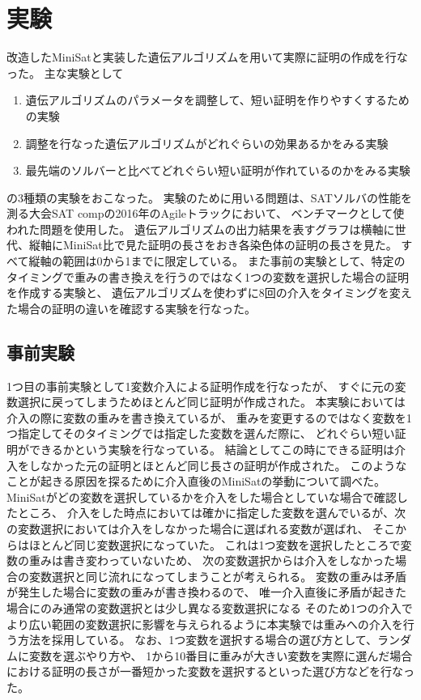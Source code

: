 \section{実験}





改造したMiniSatと実装した遺伝アルゴリズムを用いて実際に証明の作成を行なった。
主な実験として
\begin{enumerate}
    \item 遺伝アルゴリズムのパラメータを調整して、短い証明を作りやすくするための実験
    \item 調整を行なった遺伝アルゴリズムがどれぐらいの効果あるかをみる実験
    \item 最先端のソルバーと比べてどれぐらい短い証明が作れているのかをみる実験
\end{enumerate}
の3種類の実験をおこなった。
実験のために用いる問題は、SATソルバの性能を測る大会SAT compの2016年のAgileトラックにおいて、
ベンチマークとして使われた問題を使用した。
遺伝アルゴリズムの出力結果を表すグラフは横軸に世代、縦軸にMiniSat比で見た証明の長さをおき各染色体の証明の長さを見た。
すべて縦軸の範囲は0から1までに限定している。
また事前の実験として、特定のタイミングで重みの書き換えを行うのではなく1つの変数を選択した場合の証明を作成する実験と、
遺伝アルゴリズムを使わずに8回の介入をタイミングを変えた場合の証明の違いを確認する実験を行なった。





\setcounter{subsection}{-1} %





\subsection{事前実験}

1つ目の事前実験として1変数介入による証明作成を行なったが、
すぐに元の変数選択に戻ってしまうためほとんど同じ証明が作成された。
本実験においては介入の際に変数の重みを書き換えているが、
重みを変更するのではなく変数を1つ指定してそのタイミングでは指定した変数を選んだ際に、
どれぐらい短い証明ができるかという実験を行なっている。
結論としてこの時にできる証明は介入をしなかった元の証明とほとんど同じ長さの証明が作成された。
このようなことが起きる原因を探るために介入直後のMiniSatの挙動について調べた。
MiniSatがどの変数を選択しているかを介入をした場合としていな場合で確認したところ、
介入をした時点においては確かに指定した変数を選んでいるが、次の変数選択においては介入をしなかった場合に選ばれる変数が選ばれ、
そこからはほとんど同じ変数選択になっていた。
これは1つ変数を選択したところで変数の重みは書き変わっていないため、
次の変数選択からは介入をしなかった場合の変数選択と同じ流れになってしまうことが考えられる。
変数の重みは矛盾が発生した場合に変数の重みが書き換わるので、
唯一介入直後に矛盾が起きた場合にのみ通常の変数選択とは少し異なる変数選択になる
そのため1つの介入でより広い範囲の変数選択に影響を与えられるように本実験では重みへの介入を行う方法を採用している。
なお、1つ変数を選択する場合の選び方として、ランダムに変数を選ぶやり方や、
1から10番目に重みが大きい変数を実際に選んだ場合における証明の長さが一番短かった変数を選択するといった選び方などを行なった。

